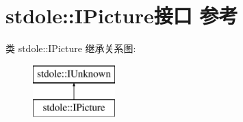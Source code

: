 \hypertarget{interfacestdole_1_1_i_picture}{}\section{stdole\+:\+:I\+Picture接口 参考}
\label{interfacestdole_1_1_i_picture}
类 stdole\+:\+:I\+Picture 继承关系图\+:\begin{figure}[H]
\begin{center}
\leavevmode
\includegraphics[height=2.000000cm]{interfacestdole_1_1_i_picture}
\end{center}
\end{figure}
